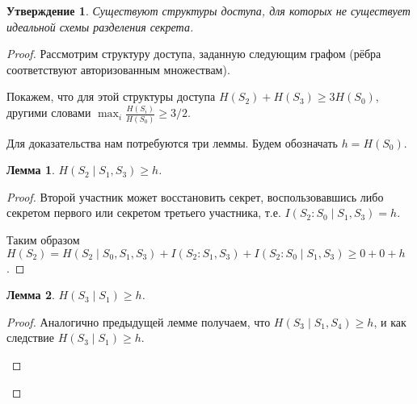 \documentclass[12pt]{article}
\theoremstyle{definition}
\theoremstyle{plain}
\newtheorem{lemma}{Лемма}[section]
\newtheorem{statement}{Утверждение}[section]
\theoremstyle{remark}
\begin{document}
\begin{statement}
    Существуют структуры доступа, для которых не существует идеальной схемы разделения секрета.
\end{statement}
\begin{proof}
    Рассмотрим структуру доступа, заданную следующим графом (рёбра соответствуют авторизованным
    множествам).
    \begin{center}
    \end{center}
    Покажем, что для этой структуры доступа $H(S_2) + H(S_3) \ge 3H(S_0)$, другими словами
    $\max_i\frac{H(S_i)}{H(S_0)} \ge 3/2$.

    Для доказательства нам потребуются три леммы. Будем обозначать $h = H(S_0)$.
    \begin{lemma}
        $H(S_2\mid S_1, S_3) \ge h$.
    \end{lemma}
    \begin{proof} Второй участник может восстановить секрет, воспользовавшись либо секретом первого
        или секретом третьего участника, т.е. $I(S_2 : S_0 \mid S_1, S_3) = h$.
    \begin{center}
    \end{center}
    Таким образом $H(S_2) = H(S_2\mid S_0,S_1,S_3) + I(S_2:S_1,S_3) + I(S_2:S_0\mid S_1,S_3) \ge 0 + 0 + h$.
    \end{proof}

    \begin{lemma}
        $H(S_3\mid S_1) \ge h$.
    \end{lemma}
    \begin{proof} Аналогично предыдущей лемме получаем, что $H(S_3\mid S_1, S_4)\ge h$, и как
        следствие $H(S_3\mid S_1)\ge h$.
    \begin{center}
\end{center}
\end{proof}
\end{proof}
\end{document}
